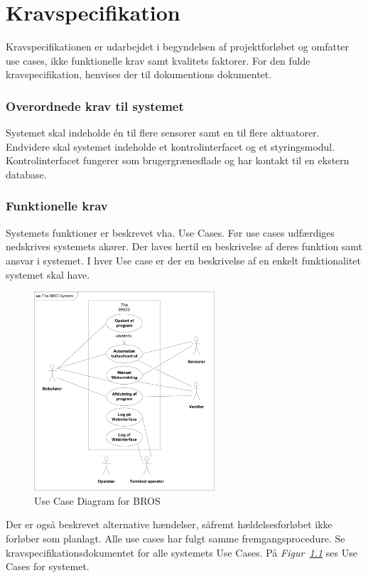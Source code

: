 \chapter{Kravspecifikation}
Kravspecifikationen er udarbejdet i begyndelsen af projektforløbet og omfatter use cases, ikke funktionelle krav samt kvalitets faktorer. For den fulde kravspecifikation, henvises der til dokumentions dokumentet.

\subsection{Overordnede krav til systemet}
Systemet skal indeholde én til flere sensorer samt en til flere aktuatorer. Endvidere skal systemet indeholde et kontrolinterfacet og et styringsmodul. Kontrolinterfacet fungerer som brugergrænesflade og har kontakt til en ekstern database.

\subsection{Funktionelle krav}
Systemets funktioner er beskrevet vha. Use Cases. Før use cases udfærdiges nedskrives systemets akører. Der laves hertil en beskrivelse af deres funktion samt ansvar i systemet. I hver Use case er der en beskrivelse af en enkelt funktionalitet systemet skal have.
\begin{figure}[H]
\centering
\includegraphics[width=0.6\textwidth]{billeder/UCDBROS}
\caption{Use Case Diagram for BROS}
\label{fig:UCDBROS}
\end{figure}
Der er også beskrevet alternative hændelser, såfremt hældelsesforløbet ikke forløber som planlagt. Alle use cases har fulgt samme fremgangsprocedure. Se kravspecifikationsdokumentet for alle systemets Use Cases. På \textit{Figur~\ref{fig:UCDBROS}} ses Use Cases for systemet.\\

